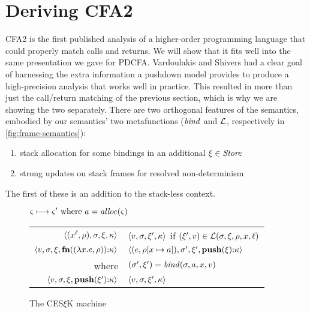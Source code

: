 \section{Deriving CFA2}
\label{sec:cfa2}

CFA2 is the first published analysis of a higher-order programming language that could properly match calls and returns.
%
We will show that it fits well into the same presentation we gave for PDCFA.
%
Vardoulakis and Shivers had a clear goal of harnessing the extra information a pushdown model provides to produce a high-precision analysis that works well in practice.
%
This resulted in more than just the call/return matching of the previous section, which is why we are showing the two separately.
%
There are two orthogonal features of the semantics, embodied by our semantics' two metafunctions ($\bind$ and $\lookup$, respectively in \autoref{fig:frame-semantics}):
\begin{enumerate}
\item{stack allocation for some bindings in an additional $\mframe \in \Store$}
\item{strong updates on stack frames for resolved non-determinism}
\end{enumerate}
The first of these is an addition to the stack-less context.

\begin{figure}
  \centering
  $\mstate \stepto \mstate' \text{ where } \maddr = \alloc(\mstate)$ \\
  \begin{tabular}{r|l}
    \hline
    $\tpl{(\svar[\mlab]{\mvar}, \menv), \mstore, \mframe, \mkont}$
    &
    $\tpl{\mval,\mstore,\mframe',\mkont}$ if $(\mframe', \mval) \in \lookup(\mstore,\mframe,\menv,\mvar,\mlab)$
    \\
    $\tpl{\mval,\mstore,\mframe,\kcons{\kfn{\vclo{\slam{\mvar}{\mexpr}}{\menv}}}{\mkont}}$
    &
    $\tpl{(\mexpr, \extm{\menv}{\mvar}{\maddr}), \mstore', \mframe', \kcons{\kpush{\mframe}}{\mkont}}$
    \\ where & $(\mstore',\mframe') = \bind(\mstore,\maddr,\mvar,\mval)$
    \\
    $\tpl{\mval,\mstore,\mframe,\kcons{\kpush{\mframe'}}{\mkont}}$
    &
    $\tpl{\mval,\mstore,\mframe',\mkont}$
  \end{tabular}
  \caption{The CES$\xi$K machine}
  \label{fig:frame-semantics}
\end{figure}

